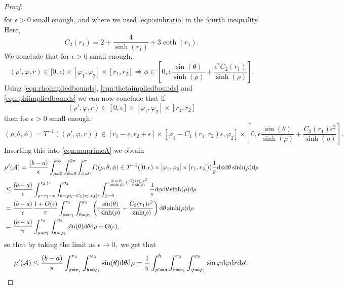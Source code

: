 \documentclass[a4paper,12pt]{article}
\newcommand{\CA}{{\mathcal{A}}}
\newcommand{\dd}{{\rm d}}
\begin{document}
\begin{proof}
\begin{align*}
\end{align*}
for $\epsilon>0$ small enough, and where we used \eqref{eqn:sinhratio} in the fourth inequality.
Here, 
\[
C_2(r_1)=2+\frac{4}{\sinh(r_1)}+3\coth(r_1).
\]
We conclude that for $\epsilon>0$ small enough,
\begin{equation} \label{eqn:phiimpliedbounds}
(\rho',\varphi,r)\in[0,\epsilon)\times [\varphi_1,\varphi_2] \times [r_1,r_2]  
\Rightarrow 
\phi\in\left[0,\epsilon\frac{\sin(\theta)}{\sinh(\rho)}+\frac{\epsilon^2C_2(r_1)}{\sinh(\rho)}\right].  
\end{equation}
Using \eqref{eqn:rhoimpliedbounds}, \eqref{eqn:thetaimpliedbounds} and 
\eqref{eqn:phiimpliedbounds} we can now conclude that if
\[
(\rho',\varphi,r)\in [0,\epsilon] \times [\varphi_1,\varphi_2]\times [r_1,r_2]  
\]
then for $\epsilon>0$ small enough,
\[
(\rho,\theta,\phi) =T^{-1}((\rho',\varphi,r)) 
\in [r_1-\epsilon,r_2+\epsilon]\times [\varphi_1-C_1(r_1,r_2)\epsilon,\varphi_2] 
\times \left[0,\epsilon\frac{\sin(\theta)}{\sinh(\rho)} 
+\frac{C_2(r_1)\epsilon^{2}}{\sinh(\rho)} \right]. \nonumber
\]
Inserting this into \eqref{eqn:muprimeA} we obtain
\begin{align*}
& \mu'(\CA) 
=\frac{(b-a)}{\epsilon}
\int_{\rho=0}^\infty  \int_{\theta=0}^{2 \pi} \int_{\phi=0}^{\pi} 
I((\rho,\theta,\phi)\in T^{-1}([0,\epsilon) \times [\varphi_1,\varphi_2]\times [r_1,r_2] )) 
\frac{1}{\pi}\dd \phi \dd \theta \sinh(\rho) \dd \rho \nonumber \\
& \leq \frac{(b-a)}{\epsilon}
\int_{\rho=r_1-\epsilon}^{r_2+\epsilon}  \int_{\theta=\varphi_1-C_1(r_1,r_2)\epsilon}^{\varphi_2}  
\int_{\phi=0}^{\epsilon\frac{\sin(\theta)}{\sinh(\rho)} +\frac{C_2(r_1)\epsilon^2}{\sinh(\rho)} } 
\frac{1}{\pi}\dd \phi \dd \theta \sinh(\rho) \dd \rho \nonumber \\
& =\frac{(b-a)}{\epsilon}\frac{1+O(\epsilon)}{\pi}
\int_{\rho=r_1}^{r_2}  \int_{\theta=\varphi_1}^{\varphi_2}  
\left(\epsilon\frac{\sin(\theta)}{\sinh(\rho)} +\frac{C_2(r_1)\epsilon^2}{\sinh(\rho)}  \right)
\dd \theta \sinh(\rho) \dd \rho \nonumber \\
& =\frac{(b-a)}{\pi}\int_{\rho=r_1}^{r_2}  \int_{\theta=\varphi_1}^{\varphi_2}  \sin(\theta) \dd \theta \dd \rho 
+O(\epsilon), \nonumber
\end{align*}
so that by taking the limit as $\epsilon\to 0,$ 
we get that 
\begin{equation} \label{eqn:muprimeAupper}
\mu'(\CA)\leq \frac{(b-a)}{\pi}\int_{\rho=r_1}^{r_2}  
\int_{\theta=\varphi_1}^{\varphi_2} 
\sin(\theta) \dd \theta \dd \rho 
=\frac{1}{\pi}\int_{\rho'=a}^b \int_{r=r_1}^{r_2} 
\int_{\varphi=\varphi_1}^{\varphi_2} 
\sin \varphi \dd \varphi \dd r \dd \rho'.    
\end{equation}



\end{proof}
\end{document}
